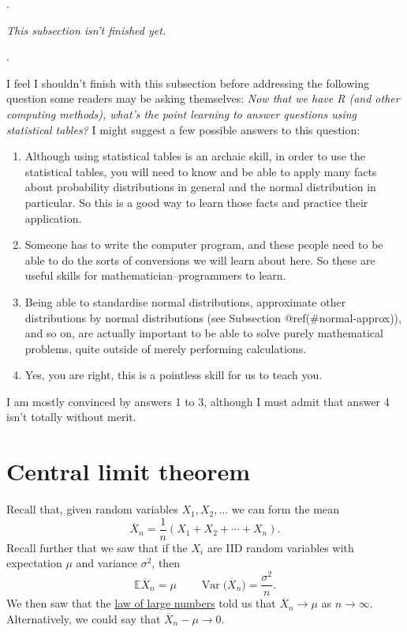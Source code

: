 \documentclass[
  a4paper,
]{book}
\providecommand{\tightlist}{%
  \setlength{\itemsep}{0pt}\setlength{\parskip}{0pt}}
\theoremstyle{definition}
\theoremstyle{definition}
\theoremstyle{definition}
\theoremstyle{definition}
\theoremstyle{remark}
\begin{document}
.

\emph{This subsection isn't finished yet.}

.

I feel I shouldn't finish with this subsection before addressing the following question some readers may be asking themselves: \emph{Now that we have R (and other computing methods), what's the point learning to answer questions using statistical tables?} I might suggest a few possible answers to this question:

\begin{enumerate}
\def\labelenumi{\arabic{enumi}.}
\tightlist
\item
  Although using statistical tables is an archaic skill, in order to use the statistical tables, you will need to know and be able to apply many facts about probability distributions in general and the normal distribution in particular. So this is a good way to learn those facts and practice their application.
\item
  Someone has to write the computer program, and these people need to be able to do the sorts of conversions we will learn about here. So these are useful skills for mathematician--programmers to learn.
\item
  Being able to standardise normal distributions, approximate other distributions by normal distributions (see Subsection @ref(\#normal-approx)), and so on, are actually important to be able to solve purely mathematical problems, quite outside of merely performing calculations.
\item
  Yes, you are right, this is a pointless skill for us to teach you.
\end{enumerate}

I am mostly convinced by answers 1 to 3, although I must admit that answer 4 isn't totally without merit.

\hypertarget{clt}{%
\section{Central limit theorem}\label{clt}}

Recall that, given random variables \(X_1, X_2, \dots\) we can form the mean
\[ \overline X_n = \frac{1}{n} (X_1 + X_2 + \cdots + X_n) . \]
Recall further that we saw that if the \(X_i\) are IID random variables with expectation \(\mu\) and variance \(\sigma^2\), then
\[ \mathbb E\overline X_n = \mu \qquad \operatorname{Var}\big(\overline X_n\big) = \frac{\sigma^2}{n} . \]
We then saw that the \protect\hyperlink{lln}{law of large numbers} told us that \(\overline X_n \to \mu\) as \(n \to \infty\). Alternatively, we could say that \(\overline X_n - \mu \to 0\).
\end{document}
